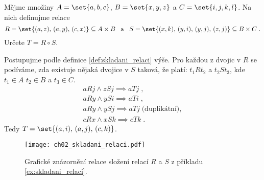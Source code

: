 \begin{example}\label{ex:skladani_relaci}
    Mějme množiny $A=\set{a,b,c}$, $B=\set{x,y,z}$ a $C=\set{i,j,k,l}$. Na nich definujme relace
    \begin{equation*}
        R=\set{(a,z),\,(a,y),\,(c,x)}\subseteq A\times B\;\;\;\text{a}\;\;\;S=\set{(x,k),\,(y,i),\,(y,j),\,(z,j)}\subseteq B\times C\; .
    \end{equation*}
    Určete $T=R\circ S$.
\end{example}
\begin{solution}
    Postupujme podle definice \ref{def:skladani_relaci} výše. Pro každou z dvojic v $R$ se podíváme, zda existuje nějaká dvojice v $S$ taková, že platí: $t_1Rt_2$ a $t_2St_3$, kde $t_1\in A$ $t_2\in B$ a $t_3\in C$.
    \begin{align*}
        aRj \land zSj \implies aTj\; ,\\
        aRy \land ySi \implies aTi\; ,\\
        aRy \land ySj \implies aTj\;\text{(duplikátní)},\\
        cRx \land xSk \implies cTk\; .
    \end{align*}
    Tedy $T=\set{(a,i),\,(a,j),\,(c,k)}$.
\end{solution}
\begin{figure}[h]
    \centering
    \texttt{[image: ch02\_skladani\_relaci.pdf]}
    \caption{Grafické znázornění relace složení relací $R$ a $S$ z příkladu \ref{ex:skladani_relaci}.}
    \label{fig:relace_mezi_mnozinami}
\end{figure}

